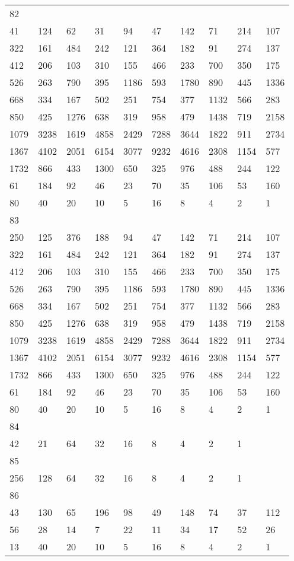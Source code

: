 \begin{longtable}{*{10}{l}}
82&&&&&&&&&\\
41& 124& 62& 31& 94& 47& 142& 71& 214& 107\\
322& 161& 484& 242& 121& 364& 182& 91& 274& 137\\
412& 206& 103& 310& 155& 466& 233& 700& 350& 175\\
526& 263& 790& 395& 1186& 593& 1780& 890& 445& 1336\\
668& 334& 167& 502& 251& 754& 377& 1132& 566& 283\\
850& 425& 1276& 638& 319& 958& 479& 1438& 719& 2158\\
1079& 3238& 1619& 4858& 2429& 7288& 3644& 1822& 911& 2734\\
1367& 4102& 2051& 6154& 3077& 9232& 4616& 2308& 1154& 577\\
1732& 866& 433& 1300& 650& 325& 976& 488& 244& 122\\
61& 184& 92& 46& 23& 70& 35& 106& 53& 160\\
80& 40& 20& 10& 5& 16& 8& 4& 2& 1\\

83&&&&&&&&&\\
250& 125& 376& 188& 94& 47& 142& 71& 214& 107\\
322& 161& 484& 242& 121& 364& 182& 91& 274& 137\\
412& 206& 103& 310& 155& 466& 233& 700& 350& 175\\
526& 263& 790& 395& 1186& 593& 1780& 890& 445& 1336\\
668& 334& 167& 502& 251& 754& 377& 1132& 566& 283\\
850& 425& 1276& 638& 319& 958& 479& 1438& 719& 2158\\
1079& 3238& 1619& 4858& 2429& 7288& 3644& 1822& 911& 2734\\
1367& 4102& 2051& 6154& 3077& 9232& 4616& 2308& 1154& 577\\
1732& 866& 433& 1300& 650& 325& 976& 488& 244& 122\\
61& 184& 92& 46& 23& 70& 35& 106& 53& 160\\
80& 40& 20& 10& 5& 16& 8& 4& 2& 1\\

84&&&&&&&&&\\
42& 21& 64& 32& 16& 8& 4& 2& 1& \\

85&&&&&&&&&\\
256& 128& 64& 32& 16& 8& 4& 2& 1& \\

86&&&&&&&&&\\
43& 130& 65& 196& 98& 49& 148& 74& 37& 112\\
56& 28& 14& 7& 22& 11& 34& 17& 52& 26\\
13& 40& 20& 10& 5& 16& 8& 4& 2& 1\\


\end{longtable}
